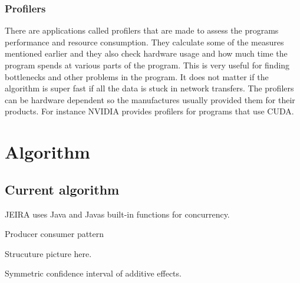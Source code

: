 \documentclass[10pt,a4paper]{article}
\begin{document}


\subsubsection{Profilers}
There are applications called profilers that are made to assess the programs performance and resource consumption. They calculate some of the measures mentioned earlier and they also check hardware usage and how much time the program spends at various parts of the program. This is very useful for finding bottlenecks and other problems in the program. It does not matter if the algorithm is super fast if all the data is stuck in network transfers. The profilers can be hardware dependent so the manufactures usually provided them for their products. For instance NVIDIA provides profilers for programs that use CUDA.\cite{introduction_hpc_hager, cuda_best_practice}

\clearpage
\section{Algorithm}







\subsection{Current algorithm}
JEIRA uses Java and Javas built-in functions for concurrency.

Producer consumer pattern

Strucuture picture here.

Symmetric confidence interval of additive effects.

\end{document}
